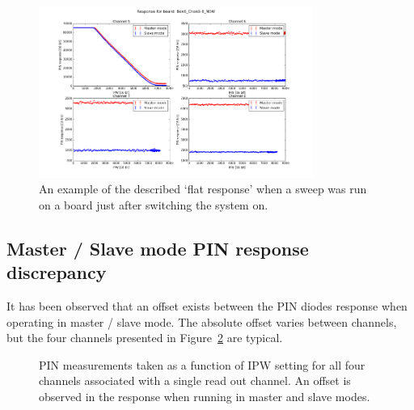 \documentclass[12pt]{report}
\begin{document}
\begin{figure}[htp]
	\begin{center}
		\includegraphics[width=0.8\textwidth]{PINFlatResponse}
		\caption{An example of the described `flat response' when a sweep was run on a board just after switching the system on.}
		\label{fig:PINFlatResponse}
	\end{center}
\end{figure}

\subsection{Master / Slave mode PIN response discrepancy}
It has been observed that an offset exists between the PIN diodes response when operating in master / slave mode. The absolute offset varies between channels, but the four channels presented in Figure~\ref{fig:PINDiscrepancy} are typical.

\begin{figure}[htp]
	\centering
	\caption{PIN measurements taken as a function of IPW setting for all four channels associated with a single read out channel. An offset is observed in the response when running in master and slave modes.}
	\label{fig:PINDiscrepancy} 
\end{figure}
\end{document}

